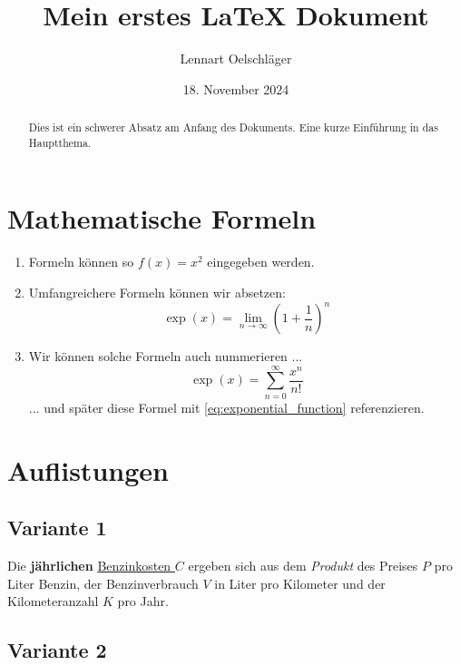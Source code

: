 \documentclass{article}
\title{Mein erstes LaTeX Dokument}
\author{Lennart Oelschläger}
\date{18. November 2024}
\begin{document}
\maketitle

\begin{abstract}
    Dies ist ein schwerer Absatz am Anfang des Dokuments. Eine kurze Einführung in das Hauptthema.
\end{abstract}

\tableofcontents

\newpage

\section{Mathematische Formeln}

\begin{enumerate}
    \item Formeln können so $f(x) = x^2$ eingegeben werden. 
    \item Umfangreichere Formeln können wir absetzen:
    $$ \exp(x) =  \lim_{n \to \infty} \left( 1 + \frac{1}{n} \right)^n $$
    \item Wir können solche Formeln auch nummerieren ...
    \begin{equation}
        \label{eq:exponential_function}
        \exp(x) = \sum_{n = 0}^\infty \frac{x^n}{n!}
    \end{equation}
    ... und später diese Formel mit \eqref{eq:exponential_function} referenzieren.
\end{enumerate}

\section{Auflistungen}

\subsection{Variante 1}

Die \textbf{jährlichen} \underline{Benzinkosten $C$} ergeben sich aus dem \textit{Produkt} des Preises $P$ pro Liter Benzin, der Benzinverbrauch $V$ in Liter pro Kilometer und der Kilometeranzahl $K$ pro Jahr.

\subsection{Variante 2}
\end{document}
